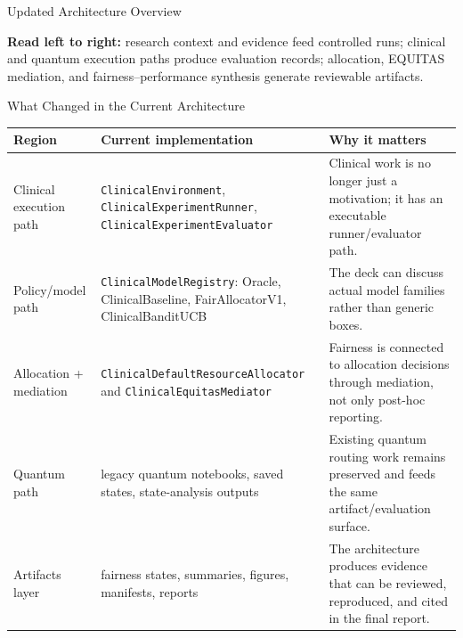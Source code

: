 
\begin{frame}{Updated Architecture Overview}
\centering
\vspace{-0.35em}
\resizebox{0.98\textwidth}{!}{%

}
\vspace{-0.15em}

\scriptsize
\textbf{Read left to right:} research context and evidence feed controlled runs; clinical and quantum execution paths produce evaluation records; allocation, EQUITAS mediation, and fairness--performance synthesis generate reviewable artifacts.
\end{frame}

\begin{frame}{What Changed in the Current Architecture}
\small
\begin{tabular}{p{}p{}p{}}
\toprule
\textbf{Region} & \textbf{Current implementation} & \textbf{Why it matters} \\
\midrule
Clinical execution path & \texttt{ClinicalEnvironment}, \texttt{ClinicalExperimentRunner}, \texttt{ClinicalExperimentEvaluator} & Clinical work is no longer just a motivation; it has an executable runner/evaluator path. \\
Policy/model path & \texttt{ClinicalModelRegistry}: Oracle, ClinicalBaseline, FairAllocatorV1, ClinicalBanditUCB & The deck can discuss actual model families rather than generic boxes. \\
Allocation + mediation & \texttt{ClinicalDefaultResourceAllocator} and \texttt{ClinicalEquitasMediator} & Fairness is connected to allocation decisions through mediation, not only post-hoc reporting. \\
Quantum path & legacy quantum notebooks, saved states, state-analysis outputs & Existing quantum routing work remains preserved and feeds the same artifact/evaluation surface. \\
Artifacts layer & fairness states, summaries, figures, manifests, reports & The architecture produces evidence that can be reviewed, reproduced, and cited in the final report. \\
\bottomrule
\end{tabular}
\end{frame}

